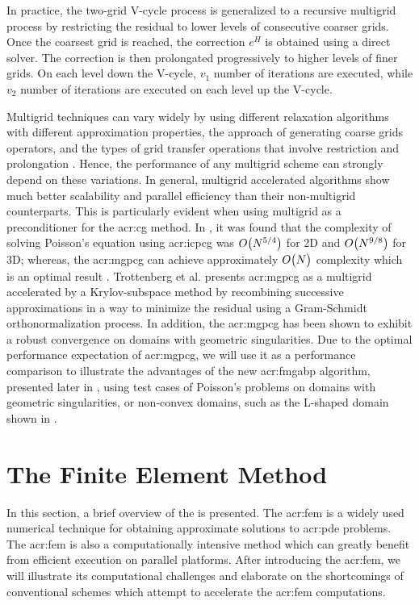 In practice, the two-grid V-cycle process is generalized to a recursive multigrid process by restricting the residual to lower levels of consecutive coarser grids.
Once the coarsest grid is reached, the correction $e^{H}$ is obtained using a direct solver.
The correction is then prolongated progressively to higher levels of finer grids.
On each level down the V-cycle, $v_1$ number of iterations are executed, while $v_2$ number of iterations are executed on each level up the V-cycle.


Multigrid techniques can vary widely by using different relaxation algorithms with different approximation properties, the approach of generating coarse grids operators, and the types of grid transfer operations that involve restriction and prolongation \cite{bib:Briggs2000AMT,bib:Trottenberg2001M}.
Hence, the performance of any multigrid scheme can strongly depend on these variations.
In general, multigrid accelerated algorithms show much better scalability and parallel efficiency than their non-multigrid counterparts.
This is particularly evident when using multigrid as a preconditioner for the \gls{acr:cg} method.
In \cite[p.~284]{bib:Trottenberg2001M}, it was found that the complexity of solving Poisson's equation using \gls{acr:icpcg} was $ O\bigl(N^{5/4}\bigr)$ for 2D and $ O\bigl(N^{9/8}\bigr)$ for 3D; whereas, the \gls{acr:mgpcg} can achieve approximately $ O\bigl(N\bigr)$ complexity which is an optimal result \cite{bib:KettlerACMGCG}.
Trottenberg et al. \cite[p.~278]{bib:Trottenberg2001M} presents \gls{acr:mgpcg} as a multigrid accelerated by a Krylov-subspace method by recombining successive approximations in a way to minimize the residual using a Gram-Schmidt orthonormalization process.
In addition, the \gls{acr:mgpcg} has been shown to exhibit a robust convergence on domains with geometric singularities.
Due to the optimal performance expectation of \gls{acr:mgpcg}, we will use it as a performance comparison to illustrate the advantages of the new \gls{acr:fmgabp} algorithm, presented later in , using test cases of Poisson's problems on domains with geometric singularities, or non-convex domains, such as the L-shaped domain shown in . 


\section{The Finite Element Method}
\label{sec:FEMVF}


In this section, a brief overview of the  is presented.
The \gls{acr:fem} is a widely used numerical technique for obtaining approximate solutions to \gls{acr:pde} problems.
The \gls{acr:fem} is also a computationally intensive method which can greatly benefit from efficient execution on parallel platforms.
After introducing the \gls{acr:fem}, we will illustrate its computational challenges and elaborate on the shortcomings of conventional schemes which attempt to accelerate the \gls{acr:fem} computations.


